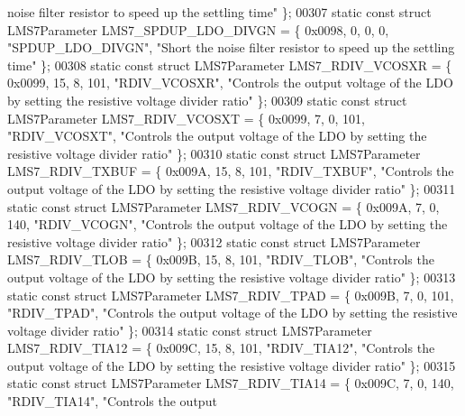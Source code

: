 \begin{DoxyCode}
{       noise filter resistor to speed up the settling time"} \};
00307 \textcolor{keyword}{static} \textcolor{keyword}{const} \textcolor{keyword}{struct }LMS7Parameter LMS7_SPDUP_LDO_DIVGN = \{ 0x0098, 0, 0, 0, \textcolor{stringliteral}{"SPDUP\_LDO\_DIVGN"}, \textcolor{stringliteral}{"Short the
       noise filter resistor to speed up the settling time"} \};
00308 \textcolor{keyword}{static} \textcolor{keyword}{const} \textcolor{keyword}{struct }LMS7Parameter LMS7_RDIV_VCOSXR = \{ 0x0099, 15, 8, 101, \textcolor{stringliteral}{"RDIV\_VCOSXR"}, \textcolor{stringliteral}{"Controls the
       output voltage of the LDO by setting the resistive voltage divider ratio"} \};
00309 \textcolor{keyword}{static} \textcolor{keyword}{const} \textcolor{keyword}{struct }LMS7Parameter LMS7_RDIV_VCOSXT = \{ 0x0099, 7, 0, 101, \textcolor{stringliteral}{"RDIV\_VCOSXT"}, \textcolor{stringliteral}{"Controls the
       output voltage of the LDO by setting the resistive voltage divider ratio"} \};
00310 \textcolor{keyword}{static} \textcolor{keyword}{const} \textcolor{keyword}{struct }LMS7Parameter LMS7_RDIV_TXBUF = \{ 0x009A, 15, 8, 101, \textcolor{stringliteral}{"RDIV\_TXBUF"}, \textcolor{stringliteral}{"Controls the
       output voltage of the LDO by setting the resistive voltage divider ratio"} \};
00311 \textcolor{keyword}{static} \textcolor{keyword}{const} \textcolor{keyword}{struct }LMS7Parameter LMS7_RDIV_VCOGN = \{ 0x009A, 7, 0, 140, \textcolor{stringliteral}{"RDIV\_VCOGN"}, \textcolor{stringliteral}{"Controls the output
       voltage of the LDO by setting the resistive voltage divider ratio"} \};
00312 \textcolor{keyword}{static} \textcolor{keyword}{const} \textcolor{keyword}{struct }LMS7Parameter LMS7_RDIV_TLOB = \{ 0x009B, 15, 8, 101, \textcolor{stringliteral}{"RDIV\_TLOB"}, \textcolor{stringliteral}{"Controls the output
       voltage of the LDO by setting the resistive voltage divider ratio"} \};
00313 \textcolor{keyword}{static} \textcolor{keyword}{const} \textcolor{keyword}{struct }LMS7Parameter LMS7_RDIV_TPAD = \{ 0x009B, 7, 0, 101, \textcolor{stringliteral}{"RDIV\_TPAD"}, \textcolor{stringliteral}{"Controls the output
       voltage of the LDO by setting the resistive voltage divider ratio"} \};
00314 \textcolor{keyword}{static} \textcolor{keyword}{const} \textcolor{keyword}{struct }LMS7Parameter LMS7_RDIV_TIA12 = \{ 0x009C, 15, 8, 101, \textcolor{stringliteral}{"RDIV\_TIA12"}, \textcolor{stringliteral}{"Controls the
       output voltage of the LDO by setting the resistive voltage divider ratio"} \};
00315 \textcolor{keyword}{static} \textcolor{keyword}{const} \textcolor{keyword}{struct }LMS7Parameter LMS7_RDIV_TIA14 = \{ 0x009C, 7, 0, 140, \textcolor{stringliteral}{"RDIV\_TIA14"}, \textcolor{stringliteral}{"Controls the output
}
\end{DoxyCode}
